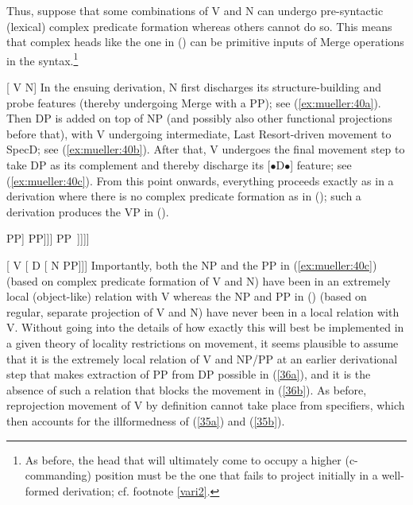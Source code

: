 \documentclass[output=paper
,modfonts
,nonflat]{langsci/langscibook}
\begin{document}
	Thus, suppose that some combinations of V and N can undergo
	pre-syntactic (lexical) complex predicate formation whereas others
	cannot do so. This means that complex heads like the one in (\Next) can
	be primitive inputs of Merge operations in the syntax.\footnote{As
		before, the head that will ultimately come to occupy a higher
		(c-commanding) position must be the one that fails to project initially in a
		well-formed derivation; cf. footnote \ref{vari2}.}
	
	\ea\relax\label{ex:mueller:39} {[} V N] \z
	In the ensuing derivation, N first discharges its structure-building
	and probe features (thereby undergoing Merge with a PP); see (\ref{ex:mueller:40a}).
	Then
	DP is added on top of NP (and possibly also other functional projections
	before that), with V undergoing intermediate, Last Resort-driven
	movement to SpecD; see (\ref{ex:mueller:40b}). After that, V undergoes the
	final  movement step to take DP as its complement and thereby
	discharge its [{\small $\bullet$}D{\small $\bullet$}] feature; see
	(\ref{ex:mueller:40c}). From this point onwards, everything proceeds exactly as in
	a derivation where there is no complex predicate formation as in
	(\Next); such a derivation produces the VP in (\NNext). 
	
	\ea\label{ex:mueller:40}
	\ea\label{ex:mueller:40a}\relax [\sub{NP} [\sub{N\sub{2}} V\sub{1} N\sub{2}] PP]
	\ex\label{ex:mueller:40b}\relax [\sub{DP} V\sub{1} [\sub{D$'$} D [\sub{NP} [\sub{N\sub{2}} t\sub{1} N\sub{2}] PP]]]
	\ex\label{ex:mueller:40c}\relax [\sub{VP} V\sub{1} [\sub{DP} t$'$\sub{1} [\sub{D$'$} D [\sub{NP} [\sub{N\sub{2}} t\sub{1} N\sub{2}] PP~]]]]
	\z
	\z
	
	\ea\label{ex:mueller:41} {[} V [ D [ N PP]]]\z
	Importantly, both the NP and the PP in (\ref{ex:mueller:40c}) (based on complex
	predicate formation of V and N) have been in an extremely local
	(object-like) relation with V whereas the NP and PP in (\Last) (based
	on regular, separate projection of V and N) have never been in a local
	relation with V. Without going into the details of how exactly this
	will best be implemented in a given theory of locality restrictions on movement, it
	seems plausible to assume that it is the extremely local relation of V
	and NP/PP at an earlier derivational step that makes extraction of PP
	from DP possible in  (\ref{36a}), and it is the absence of such a relation that blocks
	the movement in (\ref{36b}). As before, reprojection movement of V
	by definition cannot take place from specifiers, which then accounts
	for the illformedness of (\ref{35a}) and (\ref{35b}).
	
\end{document}
